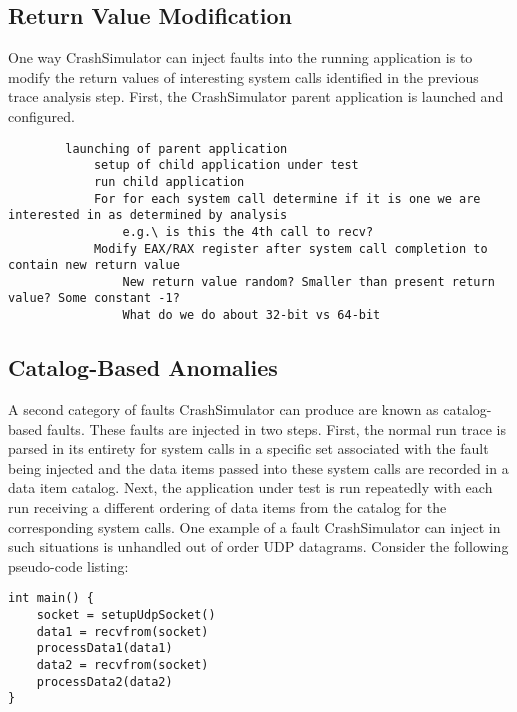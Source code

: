         \subsection{Return Value Modification}

        One way CrashSimulator can inject faults into the running application is to
        modify the return values of interesting system calls identified in the previous trace analysis step. First, the
        CrashSimulator parent application is launched and configured.

        \begin{verbatim}
        launching of parent application
            setup of child application under test
            run child application
            For for each system call determine if it is one we are interested in as determined by analysis
                e.g.\ is this the 4th call to recv?
            Modify EAX/RAX register after system call completion to contain new return value
                New return value random? Smaller than present return value? Some constant -1?
                What do we do about 32-bit vs 64-bit
        \end{verbatim}

        \subsection{Catalog-Based Anomalies}

        A second category of faults CrashSimulator can produce are known as catalog-based faults. These faults are
        injected in two steps. First, the normal run trace is parsed in its entirety for system calls in a specific set
        associated with the fault being injected and the data items passed into these system calls are recorded in a
        data item catalog. Next, the application under test is run repeatedly with each run receiving a different
        ordering of data items from the catalog for the corresponding system calls. One example of a fault
        CrashSimulator can inject in such situations is unhandled out of order UDP datagrams. Consider the following
        pseudo-code listing:

        \begin{verbatim}
int main() {
    socket = setupUdpSocket()
    data1 = recvfrom(socket)
    processData1(data1)
    data2 = recvfrom(socket)
    processData2(data2)
}
        \end{verbatim}

